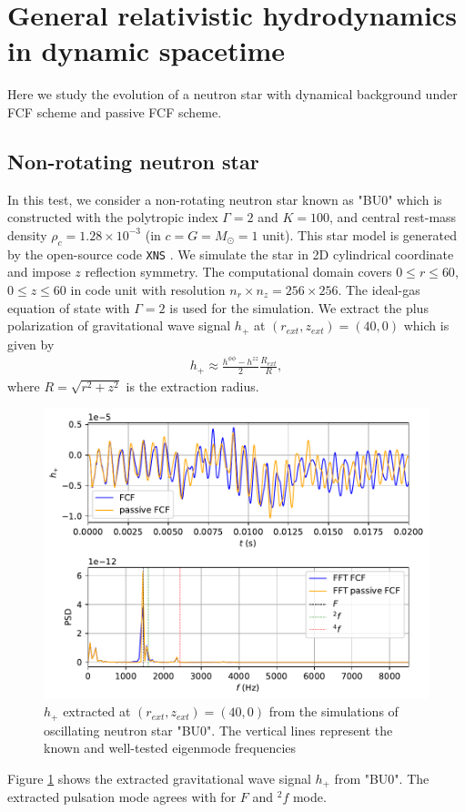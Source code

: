 \section{General relativistic hydrodynamics in dynamic spacetime} %
\label{section4.3}
Here we study the evolution of a neutron star with dynamical background under FCF scheme and passive FCF scheme.
\subsection{Non-rotating neutron star}
\label{section4.3.1}
In this test, we consider a non-rotating neutron star known as "BU0" \cite{dimmelmeier2006non}
which is constructed with the polytropic index $\Gamma = 2$ and $K = 100$,
and central rest-mass density $\rho_c = 1.28 \times 10^{-3}$ (in $c=G=M_\odot=1$ unit).
This star model is generated by the open-source code \texttt{XNS} 
\cite{bucciantini2011general,pili2014axisymmetric,pili2015general,pili2017general}.
We simulate the star in 2D cylindrical coordinate and impose $z$ reflection symmetry.
The computational domain covers $0 \leq r \leq 60$, $0\leq z \leq 60$ in code unit
with resolution $n_r \times n_z = 256 \times 256$.
The ideal-gas equation of state with $\Gamma = 2$ is used for the simulation.
We extract the plus polarization of gravitational wave signal $h_{+}$ at $(r_{ext}, z_{ext}) = (40, 0)$ which is given by
\begin{align}
    h_{+} \approx \frac{h^{\phi\phi} - h^{zz}}{2} \frac{R_{ext}}{R},
\end{align}
where $R=\sqrt{r^2+z^2}$ is the extraction radius.\\
\begin{figure}[h!]
\centering
  \includegraphics[width=\linewidth]{GW_combine_h_BU0.pdf}
\caption{$h_{+}$ extracted at $(r_{ext}, z_{ext}) = (40, 0)$ from the simulations of oscillating neutron star "BU0".
The vertical lines represent the known and well-tested eigenmode frequencies \cite{dimmelmeier2006non}}
\label{fig:GW_h_BU0}
\end{figure}
Figure \ref{fig:GW_h_BU0} shows the extracted gravitational wave signal $h_{+}$ from "BU0".
The extracted pulsation mode agrees with \cite{dimmelmeier2006non} for $F$ and ${}^2f$ mode.

